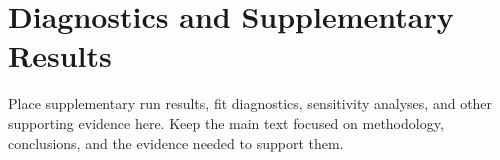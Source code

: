 \section{Diagnostics and Supplementary Results}
\label{app:diagnostics}

Place supplementary run results, fit diagnostics, sensitivity analyses, and other supporting evidence here. Keep the main text focused on methodology, conclusions, and the evidence needed to support them.

